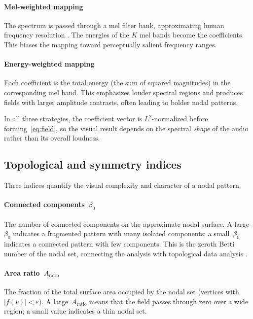 \documentclass[]{interact}
\theoremstyle{plain}
\theoremstyle{definition}
\theoremstyle{remark}
\begin{document}
\paragraph{Mel-weighted mapping}
The spectrum is passed through a mel filter bank, approximating human frequency resolution \citep{sethares1998}. The energies of the $K$ mel bands become the coefficients. This biases the mapping toward perceptually salient frequency ranges.

\paragraph{Energy-weighted mapping}
Each coefficient is the total energy (the sum of squared magnitudes) in the corresponding mel band. This emphasizes louder spectral regions and produces fields with larger amplitude contrasts, often leading to bolder nodal patterns.

In all three strategies, the coefficient vector is $L^2$-normalized before forming~\eqref{eq:field}, so the visual result depends on the spectral \emph{shape} of the audio rather than its overall loudness.

\subsection{Topological and symmetry indices}
\label{sec:indices}

Three indices quantify the visual complexity and character of a nodal pattern.

\paragraph{Connected components~$\beta_0$}
The number of connected components on the approximate nodal surface. A large~$\beta_0$ indicates a fragmented pattern with many isolated components; a small~$\beta_0$ indicates a connected pattern with few components. This is the zeroth Betti number of the nodal set, connecting the analysis with topological data analysis \citep{edelsbrunner2000,ghrist2007}.

\paragraph{Area ratio~$A_{\mathrm{ratio}}$}
The fraction of the total surface area occupied by the nodal set (vertices with $|f(v)|<\varepsilon$). A large~$A_{\mathrm{ratio}}$ means that the field passes through zero over a wide region; a small value indicates a thin nodal set.
\end{document}
